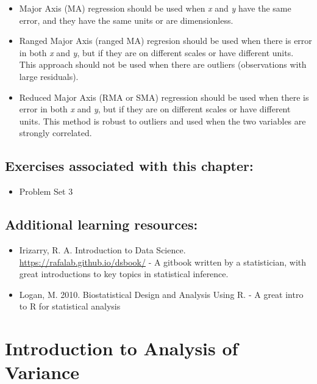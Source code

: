 \documentclass[]{book}
\providecommand{\tightlist}{%
  \setlength{\itemsep}{0pt}\setlength{\parskip}{0pt}}
\begin{document}
\begin{itemize}
\item
  Major Axis (MA) regression should be used when \emph{x} and \emph{y} have the same error, and they have the same units or are dimensionless.
\item
  Ranged Major Axis (ranged MA) regresion should be used when there is error in both \emph{x} and \emph{y}, but if they are on different scales or have different units. This approach should not be used when there are outliers (observations with large residuals).
\item
  Reduced Major Axis (RMA or SMA) regression should be used when there is error in both \emph{x} and \emph{y}, but if they are on different scales or have different units. This method is robust to outliers and used when the two variables are strongly correlated.
\end{itemize}

\hypertarget{exercises-associated-with-this-chapter-7}{%
\section{Exercises associated with this chapter:}\label{exercises-associated-with-this-chapter-7}}

\begin{itemize}
\tightlist
\item
  Problem Set 3
\end{itemize}

\hypertarget{additional-learning-resources-7}{%
\section{Additional learning resources:}\label{additional-learning-resources-7}}

\begin{itemize}
\item
  Irizarry, R. A. Introduction to Data Science. \url{https://rafalab.github.io/dsbook/} - A gitbook written by a statistician, with great introductions to key topics in statistical inference.
\item
  Logan, M. 2010. Biostatistical Design and Analysis Using R. - A great intro to R for statistical analysis
\end{itemize}

\hypertarget{introduction-to-analysis-of-variance}{%
\chapter{Introduction to Analysis of Variance}\label{introduction-to-analysis-of-variance}}
\end{document}
